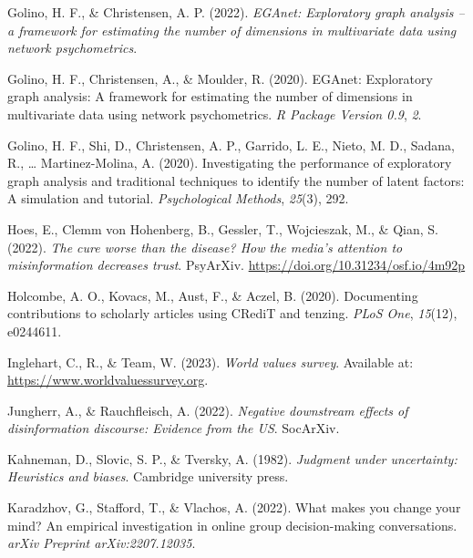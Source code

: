 \documentclass[
  ,jou,floatsintext]{apa6}
\newlength{\cslhangindent}
\newlength{\cslentryspacingunit} %
\newenvironment{CSLReferences}[2] %
 {%
  \setlength{\parindent}{0pt}
  \ifodd #1
  \let\oldpar\par
  \def\par{\hangindent=\cslhangindent\oldpar}
  \fi
  \setlength{\parskip}{#2\cslentryspacingunit}
 }%
 {}
\begin{document}
\begin{CSLReferences}{1}{0}
\leavevmode{}%
Golino, H. F., \& Christensen, A. P. (2022). \emph{EGAnet: Exploratory graph analysis -- a framework for estimating the number of dimensions in multivariate data using network psychometrics}.

\leavevmode{}%
Golino, H. F., Christensen, A., \& Moulder, R. (2020). EGAnet: Exploratory graph analysis: A framework for estimating the number of dimensions in multivariate data using network psychometrics. \emph{R Package Version 0.9}, \emph{2}.

\leavevmode{}%
Golino, H. F., Shi, D., Christensen, A. P., Garrido, L. E., Nieto, M. D., Sadana, R., \ldots{} Martinez-Molina, A. (2020). Investigating the performance of exploratory graph analysis and traditional techniques to identify the number of latent factors: A simulation and tutorial. \emph{Psychological Methods}, \emph{25}(3), 292.

\leavevmode{}%
Hoes, E., Clemm von Hohenberg, B., Gessler, T., Wojcieszak, M., \& Qian, S. (2022). \emph{The cure worse than the disease? How the media's attention to misinformation decreases trust}. PsyArXiv. \url{https://doi.org/10.31234/osf.io/4m92p}

\leavevmode{}%
Holcombe, A. O., Kovacs, M., Aust, F., \& Aczel, B. (2020). Documenting contributions to scholarly articles using CRediT and tenzing. \emph{PLoS One}, \emph{15}(12), e0244611.

\leavevmode{}%
Inglehart, C., R., \& Team, W. (2023). \emph{World values survey}. Available at: \url{https://www.worldvaluessurvey.org}.

\leavevmode{}%
Jungherr, A., \& Rauchfleisch, A. (2022). \emph{Negative downstream effects of disinformation discourse: Evidence from the US}. SocArXiv.

\leavevmode{}%
Kahneman, D., Slovic, S. P., \& Tversky, A. (1982). \emph{Judgment under uncertainty: Heuristics and biases}. Cambridge university press.

\leavevmode{}%
Karadzhov, G., Stafford, T., \& Vlachos, A. (2022). What makes you change your mind? An empirical investigation in online group decision-making conversations. \emph{arXiv Preprint arXiv:2207.12035}.


\end{CSLReferences}
\end{document}
